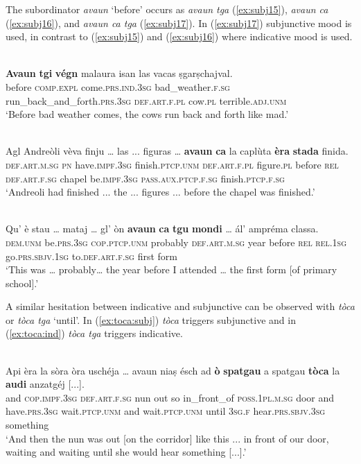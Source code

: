 The subordinator \textit{avaun} `before' occurs as \textit{avaun tga} (\ref{ex:subj15}), \textit{avaun ca} (\ref{ex:subj16}), and \textit{avaun ca tga} (\ref{ex:subj17}). In (\ref{ex:subj17}) subjunctive mood is used, in contrast to (\ref{ex:subj15}) and (\ref{ex:subj16}) where indicative mood is used.

\ea
\label{ex:subj15}
\\
\gll   \textbf{Avaun} \textbf{tgi} \textbf{végn} malaura isan las vacas ṣgarṣchajval.\\
before \textsc{comp.expl} come.\textsc{prs.ind.3sg} bad\_weather.\textsc{f.sg} run\_back\_and\_forth.\textsc{prs.3sg} \textsc{def.art.f.pl} cow.\textsc{pl} terrible.\textsc{adj.unm} \\
\glt `Before bad weather comes, the cows run back and forth like mad.'
\z

\ea
\label{ex:subj16}
\\
\gll  Agl Andreòli vèva finju … las ... figuras … \textbf{avaun} \textbf{ca} la caplùta \textbf{èra} \textbf{stada} finida.\\
\textsc{def.art.m.sg} \textsc{pn} have.\textsc{impf.3sg} finish.\textsc{ptcp.unm} {} \textsc{def.art.f.pl} {} figure.\textsc{pl} {} before \textsc{rel} \textsc{def.art.f.sg} chapel be.\textsc{impf.3sg} \textsc{pass.aux.ptcp.f.sg} finish.\textsc{ptcp.f.sg} \\
\glt `Andreoli had finished ... the ... figures ... before the chapel was finished.'
\z

\ea
\label{ex:subj17}
\\
\gll    Qu’ è stau … mataj … gl' òn \textbf{avaun} \textbf{ca} \textbf{tgu} \textbf{mondi} … ál’ ampréma classa.\\
\textsc{dem.unm} be.\textsc{prs.3sg} \textsc{cop.ptcp.unm} {} probably {} \textsc{def.art.m.sg} year before \textsc{rel} \textsc{rel.1sg} go.\textsc{prs.sbjv.1sg} {} to.\textsc{def.art.f.sg} first form\\
\glt `This was … probably… the year before I attended … the first form [of primary school].'
\z

A similar hesitation between indicative and subjunctive can be observed with \textit{tòca} or \textit{tòca tga} `until'. In (\ref{ex:toca:subj}) \textit{tòca} triggers subjunctive and in (\ref{ex:toca:ind}) \textit{tòca tga} triggers indicative.

\ea
\label{ex:toca:subj}
\\
\gll    Api èra la sòra òra uschéja … avaun niaṣ ésch ad \textbf{ò} \textbf{spatgau} a spatgau \textbf{tòca} la \textbf{audi} anzatgéj [...].\\
and \textsc{cop.impf.3sg} \textsc{def.art.f.sg} nun out so {} in\_front\_of \textsc{poss.1pl.m.sg} door and have.\textsc{prs.3sg} wait.\textsc{ptcp.unm} and wait.\textsc{ptcp.unm} until \textsc{3sg.f} hear.\textsc{prs.sbjv.3sg} something\\
\glt `And then the nun was out [on the corridor] like this ... in front of our door, waiting and waiting until she would hear something [...].'
\z

